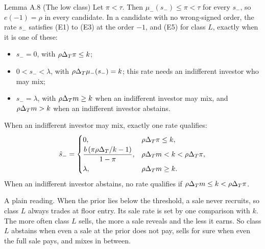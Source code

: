 \begin{paperresult}{Lemma A.8 (The low class)}
Let \(\pi<\tau\). Then \(\mu_-(s_-)\le\pi<\tau\) for every \(s_-\), so \(e(-1)=\rho\) in every candidate. In a
candidate with no wrong-signed order, the rate \(s_-\) satisfies (E1) to (E3) at the order \(-1\), and (E5) for class
\(L\), exactly when it is one of these:
\begin{itemize}[leftmargin=2.5em]
\item[(N)] \(s_-=0\), with \(\rho\Delta_T\pi\le k\);
\item[(Q)] \(0<s_-<\lambda\), with \(\rho\Delta_T\mu_-(s_-)=k\); this rate needs an indifferent investor who may mix;
\item[(F)] \(s_-=\lambda\), with \(\rho\Delta_T m\ge k\) when an indifferent investor may mix, and \(\rho\Delta_T m>k\) when an
indifferent investor abstains.
\end{itemize}
When an indifferent investor may mix, exactly one rate qualifies:
\[
\hat s_-=\begin{cases}0, & \rho\Delta_T\pi\le k,\\[2pt]
\dfrac{b\,(\pi\rho\Delta_T/k-1)}{1-\pi}, & \rho\Delta_T m<k<\rho\Delta_T\pi,\\[6pt]
\lambda, & \rho\Delta_T m\ge k.\end{cases}
\]
When an indifferent investor abstains, no rate qualifies if \(\rho\Delta_T m\le k<\rho\Delta_T\pi\).
\end{paperresult}

A plain reading. When the prior lies below the threshold, a sale never recruits, so class \(L\) always trades at
floor entry. Its sale rate is set by one comparison with \(k\). The more often class \(L\) sells, the more a sale
reveals and the less it earns. So class \(L\) abstains when even a sale at the prior does not pay, sells for sure when
even the full sale pays, and mixes in between.

